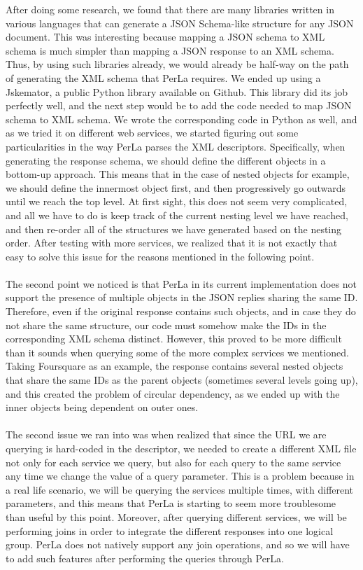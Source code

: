 After doing some research, we found that there are many libraries written in various languages that can generate a JSON Schema-like structure for any JSON document. This was interesting because mapping a JSON schema to XML schema is much simpler than mapping a JSON response to an XML schema. Thus, by using such libraries already, we would already be half-way on the path of generating the XML schema that PerLa requires. We ended up using a Jskemator, a public Python library available on Github. This library did its job perfectly well, and the next step would be to add the code needed to map JSON schema to XML schema. We wrote the corresponding code in Python as well, and as we tried it on different web services, we started figuring out some particularities in the way PerLa parses the XML descriptors. Specifically, when generating the response schema, we should define the different objects in a bottom-up approach. This means that in the case of nested objects for example, we should define the innermost object first, and then progressively go outwards until we reach the top level. At first sight, this does not seem very complicated, and all we have to do is keep track of the current nesting level we have reached, and then re-order all of the structures we have generated based on the nesting order. After testing with more services, we realized that it is not exactly that easy to solve this issue for the reasons mentioned in the following point.\\\\
The second point we noticed is that PerLa in its current implementation does not support the presence of multiple objects in the JSON replies sharing the same ID. Therefore, even if the original response contains such objects, and in case they do not share the same structure, our code must somehow make the IDs in the corresponding XML schema distinct. However, this proved to be more difficult than it sounds when querying some of the more complex services we mentioned. Taking Foursquare as an example, the response contains several nested objects that share the same IDs as the parent objects (sometimes several levels going up), and this created the problem of circular dependency, as we ended up with the inner objects being dependent on outer ones.\\\\
The second issue we ran into was when realized that since the URL we are querying is hard-coded in the descriptor, we needed to create a different XML file not only for each service we query, but also for each query to the same service any time we change the value of a query parameter. This is a problem because in a real life scenario, we will be querying the services multiple times, with different parameters, and this means that PerLa is starting to seem more troublesome than useful by this point. Moreover, after querying different services, we will be performing joins in order to integrate the different responses into one logical group. PerLa does not natively support any join operations, and so we will have to add such features after performing the queries through PerLa.\\\\
